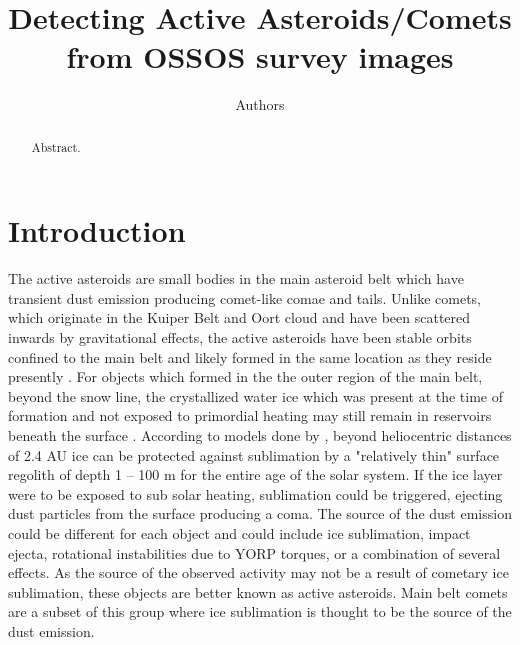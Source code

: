 \documentclass[iop,apj]{emulateapj}
\begin{document}
\title{Detecting Active Asteroids/Comets from OSSOS survey images}
\author{Authors}

\begin{abstract}
Abstract.
\end{abstract}

\maketitle

\section{Introduction}

The active asteroids are small bodies in the main asteroid belt which have transient dust emission producing comet-like comae and tails. Unlike comets, which originate in the Kuiper Belt and Oort cloud and have been scattered inwards by gravitational effects, the active asteroids have been stable orbits confined to the main belt and likely formed in the same location as they reside presently \citep{sheppard14}. For objects which formed in the the outer region of the main belt, beyond the snow line, the crystallized water ice which was present at the time of formation and not exposed to primordial heating may still remain in reservoirs beneath the surface \citep{sonnett11}.  According to models done by \citet*{fanale89},  beyond heliocentric distances of 2.4 AU ice can be protected against sublimation by a "relatively thin" surface regolith  of depth 1 -- 100 m for the entire age of the solar system. If the ice layer were to be exposed to sub solar heating,  sublimation could be triggered,  ejecting dust particles from the surface producing a coma.  %
The source of the dust emission could be different for each object and could include ice sublimation, impact ejecta, rotational instabilities due to YORP torques, or a combination of several effects. \citep{hsieh15}%
As the source of the observed activity may not be a result of cometary ice sublimation, these objects are better known as active asteroids. Main belt comets are a subset of this group where ice sublimation is thought to be the source of the dust emission. 
\end{document}
